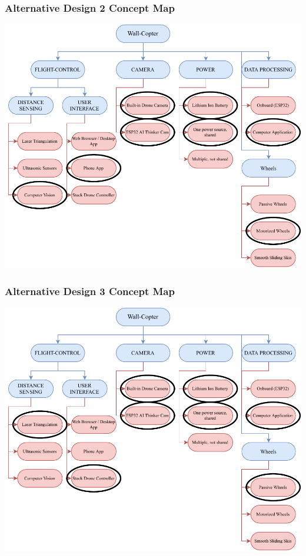 \documentclass[12pt]{article}
\begin{document}
            \subsubsection{Alternative Design 2 Concept Map}
                \centerline{\includegraphics{./resources/assignment3-Design2.concept_map.drawio.pdf}}
            
            \subsubsection{Alternative Design 3 Concept Map}
                \centerline{\includegraphics{./resources/assignment3-Design3.concept_map.drawio.pdf}}
        
\end{document}
